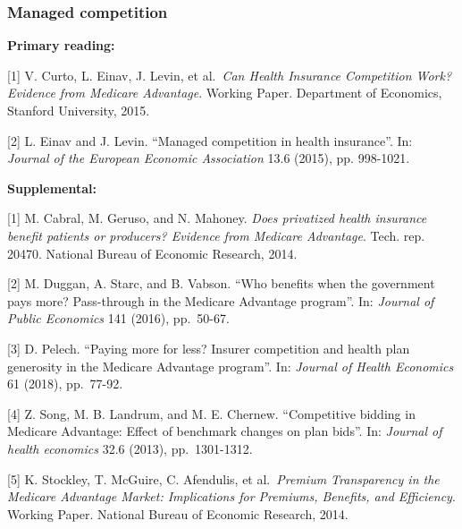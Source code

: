 \documentclass[11pt,]{article}
\begin{document}
\hypertarget{managed-competition}{%
\subsubsection{Managed competition}\label{managed-competition}}

\textbf{Primary reading:}

{[}1{]} V. Curto, L. Einav, J. Levin, et al.~\emph{Can Health Insurance
Competition Work? Evidence from Medicare Advantage}. Working Paper.
Department of Economics, Stanford University, 2015.

{[}2{]} L. Einav and J. Levin. ``Managed competition in health
insurance''. In: \emph{Journal of the European Economic Association}
13.6 (2015), pp. 998-1021.

\textbf{Supplemental:}

{[}1{]} M. Cabral, M. Geruso, and N. Mahoney. \emph{Does privatized
health insurance benefit patients or producers? Evidence from Medicare
Advantage}. Tech. rep. 20470. National Bureau of Economic Research,
2014.

{[}2{]} M. Duggan, A. Starc, and B. Vabson. ``Who benefits when the
government pays more? Pass-through in the Medicare Advantage program''.
In: \emph{Journal of Public Economics} 141 (2016), pp.~50-67.

{[}3{]} D. Pelech. ``Paying more for less? Insurer competition and
health plan generosity in the Medicare Advantage program''. In:
\emph{Journal of Health Economics} 61 (2018), pp.~77-92.

{[}4{]} Z. Song, M. B. Landrum, and M. E. Chernew. ``Competitive bidding
in Medicare Advantage: Effect of benchmark changes on plan bids''. In:
\emph{Journal of health economics} 32.6 (2013), pp.~1301-1312.

{[}5{]} K. Stockley, T. McGuire, C. Afendulis, et al.~\emph{Premium
Transparency in the Medicare Advantage Market: Implications for
Premiums, Benefits, and Efficiency}. Working Paper. National Bureau of
Economic Research, 2014.
\end{document}
